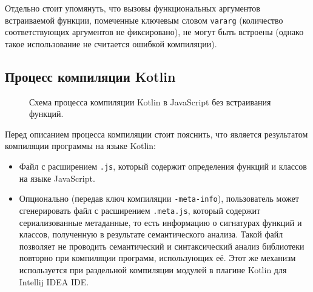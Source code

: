 Отдельно стоит упомянуть, что вызовы функциональных аргументов встраиваемой функции, помеченные
ключевым словом \texttt{vararg} (количество соответствующих
аргументов не фиксировано), не могут быть встроены (однако
такое использование не считается ошибкой компиляции).

\subsection{Процесс компиляции Kotlin}

\begin{figure}[H]

\caption{Схема процесса компиляции Kotlin в JavaScript без встраивания функций.}
\label{fig:compilation1}
\end{figure}

Перед описанием процесса компиляции стоит пояснить,
что является результатом компиляции программы на языке Kotlin:
\begin{itemize}
  \item Файл с расширением \texttt{.js}, который содержит
  определения функций и классов на языке JavaScript.
  \item Опционально (передав ключ компиляции \texttt{-meta-info}),
  пользователь может сгенерировать файл с расширением
  \texttt{.meta.js}, который содержит сериализованные метаданные,
  то есть информацию о сигнатурах функций и классов,
  полученную в результате семантического анализа.
  Такой файл позволяет не проводить семантический и синтаксический
  анализ библиотеки повторно при компиляции программ,
  использующих её. Этот же механизм используется
  при раздельной компиляции модулей в плагине Kotlin для
  Intellij IDEA IDE.
\end{itemize}

